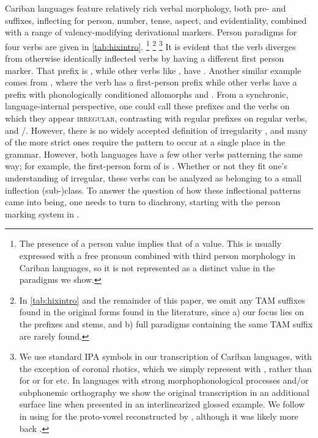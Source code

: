 

Cariban languages feature relatively rich verbal morphology, both pre- and suffixes, inflecting for person, number, tense, aspect, and evidentiality, combined with a range of valency-modifying derivational markers.
Person paradigms for four \hixka {} verbs are given in \cref{tab:hixintro}.%
\footnote{The presence of a  person value implies that of a  value.
This is usually expressed with a free pronoun combined with third person morphology in Cariban languages, so it is not represented as a distinct value in the paradigms we show.}%
\footnote{In \cref{tab:hixintro} and the remainder of this paper, we omit any TAM suffixes found in the original forms found in the literature, since a) our focus lies on the prefixes and stems, and b) full paradigms containing the same TAM suffix are rarely found.}%
\footnote{
We use standard IPA symbols in our transcription of Cariban languages, with the exception of coronal rhotics, which we simply represent with , rather than  for \wayana or  for \maqui etc.
In languages with strong morphophonological processes and/or subphonemic orthography we show the original transcription in an additional surface line when presented in an interlinearized glossed example.
We follow \textcite{gildea2018reconstructing} in using  for the proto-vowel reconstructed by \textcite{meira2005southern}, although it was likely more back \parencite{gildea2010story}.}
It is evident that the verb  diverges from otherwise identically inflected verbs by having a different first person marker.
That prefix is , while other  verbs like , have .
Another similar example comes from \trio, where the verb  has a first-person prefix  while other  verbs have a prefix with phonologically conditioned allomorphs  and  .
From a synchronic, language-internal perspective, one could call these prefixes and the verbs on which they appear \textsc{irregular}, contrasting with regular prefixes on regular  verbs,  and /.
However, there is no widely accepted definition of irregularity \parencite{stolz2012introduction}, and many of the more strict ones \parencite[][e.g.]{haspelmath2010understanding} require the pattern to occur at a single place in the grammar.
However, both languages have a few other verbs patterning the same way; for example, the first-person form of \trio {} is .
Whether or not they fit one's understanding of irregular, these verbs can be analyzed as belonging to a small inflection (sub-)class. %
To answer the question of how these inflectional patterns came into being, one needs to turn to diachrony, starting with the person marking system in \PC.

